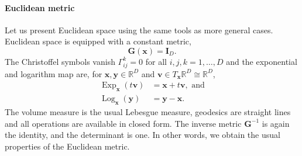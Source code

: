 \paragraph{Euclidean metric}
Let us present Euclidean space using the same tools as more general cases. Euclidean space is equipped with a constant metric, 
\begin{equation*}
 \mathbf{G}(\boldsymbol{x}) = \mathbf{I}_D.
\end{equation*}
The Christoffel symbols vanish $\Gamma_{ij}^k=0$ for all $i,j,k=1,\ldots,D$ and the exponential and logarithm map are, for $\boldsymbol{x},\boldsymbol{y} \in \mathbb{R}^D$ and $\boldsymbol{v} \in T_{\boldsymbol{x}} \mathbb{R}^D \cong \mathbb{R}^D$,
\begin{equation}\label{eq:Euclidean_exp_log}
\begin{aligned}
\operatorname{Exp}_{\boldsymbol{x}}(t\boldsymbol{v}) &= \boldsymbol{x} + t\boldsymbol{v}, \text{ and}\\
\operatorname{Log}_{\boldsymbol{x}}(\boldsymbol{y}) &= \boldsymbol{y} - \boldsymbol{x}.
\end{aligned}
\end{equation}
The volume measure is the usual Lebesgue measure, geodesics are straight lines and all operations are available in closed form. The inverse metric $\mathbf{G}^{-1}$ is again the identity, and the determinant is one. In other words, we obtain the usual properties of the Euclidean metric.

